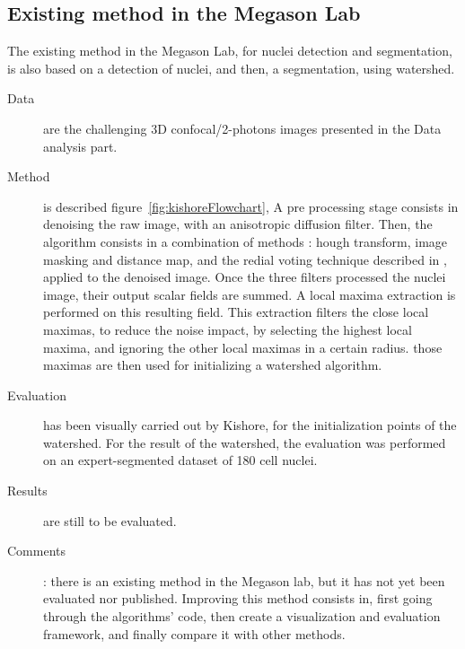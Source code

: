 \subsection*{Existing method in the Megason Lab}
\label{sect:megasonExisting}
The existing method in the Megason Lab, for nuclei detection and segmentation, is also based on a detection of nuclei, and then, a segmentation, using watershed.
  \begin{description}
  \item[Data] are the challenging 3D confocal/2-photons images presented in the Data analysis part. 
  \item[Method] is described figure~\ref{fig:kishoreFlowchart},
  A pre processing stage consists in denoising the raw image, with an anisotropic diffusion filter.
  Then, the algorithm consists in a combination of methods : 
  hough transform, image masking and distance map, and the redial voting technique described in \cite{chang2007segmentation}, applied to the denoised image.
  Once the three filters processed the nuclei image, their output scalar fields are summed.
  A local maxima extraction is performed on this resulting field.
  This extraction filters the close local maximas, to reduce the noise impact, by selecting the highest local maxima, and ignoring the other local maximas in a certain radius.
  those maximas are then used for initializing a watershed algorithm.
  \item[Evaluation] has been visually carried out by Kishore, for the initialization points of the watershed.
  For the result of the watershed, the evaluation was performed on an expert-segmented dataset of 180 cell nuclei.
  \item[Results] are still to be evaluated.
  \item[Comments]: there is an existing method in the Megason lab, but it has not yet been evaluated nor published. Improving this method consists in, first going through the algorithms' code, then create a visualization and evaluation framework, and finally compare it with other methods.
\end{description}
